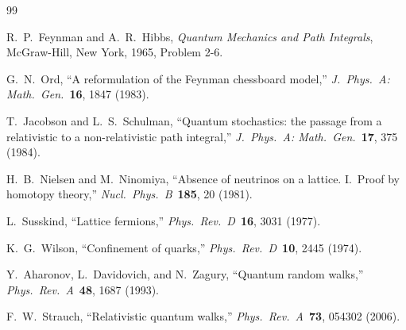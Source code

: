 \documentclass[twocolumn,showpacs,preprintnumbers,amsmath,amssymb]{revtex4-2}
\begin{document}
\begin{thebibliography}{99}

  R.~P.~Feynman and A.~R.~Hibbs,
  \emph{Quantum Mechanics and Path Integrals},
  McGraw-Hill, New York, 1965, Problem 2-6.

  G.~N.~Ord,
  ``A reformulation of the Feynman chessboard model,''
  \emph{J.\ Phys.\ A: Math.\ Gen.}\ \textbf{16}, 1847 (1983).

  T.~Jacobson and L.~S.~Schulman,
  ``Quantum stochastics: the passage from a relativistic to a non-relativistic
    path integral,''
  \emph{J.\ Phys.\ A: Math.\ Gen.}\ \textbf{17}, 375 (1984).

  H.~B.~Nielsen and M.~Ninomiya,
  ``Absence of neutrinos on a lattice. I.\ Proof by homotopy theory,''
  \emph{Nucl.\ Phys.\ B}\ \textbf{185}, 20 (1981).

  L.~Susskind,
  ``Lattice fermions,''
  \emph{Phys.\ Rev.\ D}\ \textbf{16}, 3031 (1977).

  K.~G.~Wilson,
  ``Confinement of quarks,''
  \emph{Phys.\ Rev.\ D}\ \textbf{10}, 2445 (1974).

  Y.~Aharonov, L.~Davidovich, and N.~Zagury,
  ``Quantum random walks,''
  \emph{Phys.\ Rev.\ A}\ \textbf{48}, 1687 (1993).

  F.~W.~Strauch,
  ``Relativistic quantum walks,''
  \emph{Phys.\ Rev.\ A}\ \textbf{73}, 054302 (2006).

\end{thebibliography}
\end{document}

